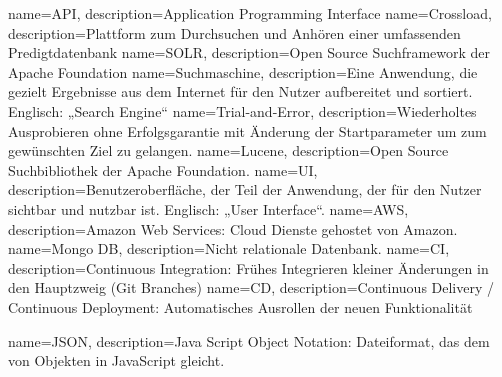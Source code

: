 {
    name={API},
    description={Application Programming Interface}
}
{
    name={Crossload},
    description={Plattform zum Durchsuchen und Anhören einer umfassenden Predigtdatenbank}
}
{
    name={SOLR},
    description={Open Source Suchframework der Apache Foundation}
}
{
    name={Suchmaschine},
    description={Eine Anwendung, die gezielt Ergebnisse aus dem Internet für den Nutzer aufbereitet und sortiert. Englisch: „Search Engine“}
}
{
    name={Trial-and-Error},
    description={Wiederholtes Ausprobieren ohne Erfolgsgarantie mit Änderung der Startparameter um zum gewünschten Ziel zu gelangen.}
}
{
    name={Lucene},
    description={Open Source Suchbibliothek der Apache Foundation.}
}
{
    name={UI},
    description={Benutzeroberfläche, der Teil der Anwendung, der für den Nutzer sichtbar und nutzbar ist. Englisch: „User Interface“.}
}
{
    name={AWS},
    description={Amazon Web Services: Cloud Dienste gehostet von Amazon.}
}
{
    name={Mongo DB},
    description={Nicht relationale Datenbank.}
}
{
    name={CI},
    description={Continuous Integration: Frühes Integrieren kleiner Änderungen in den Hauptzweig (Git Branches)}
}
{
    name={CD},
    description={Continuous Delivery / Continuous Deployment: Automatisches Ausrollen der neuen Funktionalität}
}

{
    name={JSON},
    description={Java Script Object Notation: Dateiformat, das dem von Objekten in JavaScript gleicht.}
}


\glsaddall
